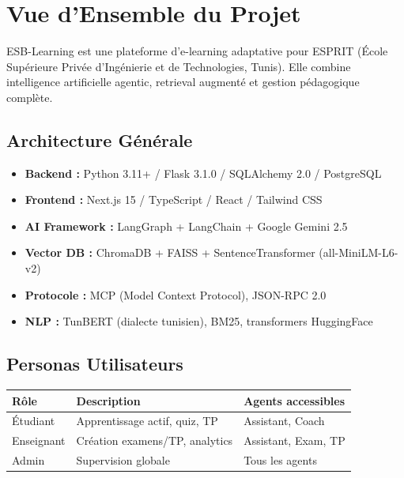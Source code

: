 \documentclass[12pt,a4paper]{article}
\begin{document}
\section{Vue d'Ensemble du Projet}

ESB-Learning est une plateforme d'e-learning adaptative pour ESPRIT (École Supérieure Privée d'Ingénierie et de Technologies, Tunis). Elle combine intelligence artificielle agentic, retrieval augmenté et gestion pédagogique complète.

\subsection{Architecture Générale}

\begin{tcolorbox}[colback=lightgray,colframe=espritblue,title=Stack Technique]
\begin{itemize}[noitemsep]
  \item \textbf{Backend :} Python 3.11+ / Flask 3.1.0 / SQLAlchemy 2.0 / PostgreSQL
  \item \textbf{Frontend :} Next.js 15 / TypeScript / React / Tailwind CSS
  \item \textbf{AI Framework :} LangGraph + LangChain + Google Gemini 2.5
  \item \textbf{Vector DB :} ChromaDB + FAISS + SentenceTransformer (all-MiniLM-L6-v2)
  \item \textbf{Protocole :} MCP (Model Context Protocol), JSON-RPC 2.0
  \item \textbf{NLP :} TunBERT (dialecte tunisien), BM25, transformers HuggingFace
\end{itemize}
\end{tcolorbox}

\subsection{Personas Utilisateurs}

\begin{longtable}{lll}
\toprule
\textbf{Rôle} & \textbf{Description} & \textbf{Agents accessibles} \\
\midrule
Étudiant & Apprentissage actif, quiz, TP & Assistant, Coach \\
Enseignant & Création examens/TP, analytics & Assistant, Exam, TP \\
Admin & Supervision globale & Tous les agents \\
\bottomrule
\end{longtable}
\end{document}
